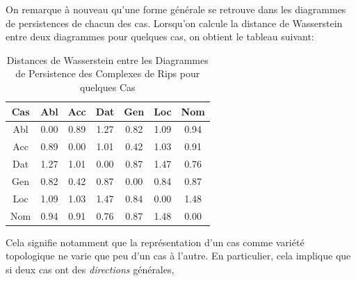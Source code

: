 \documentclass{cours}
\begin{document}
On remarque à nouveau qu'une forme générale se retrouve dans les diagrammes de persistences de chacun des cas.
Lorsqu'on calcule la distance de Wasserstein entre deux diagrammes pour quelques cas, on obtient le tableau suivant:

\begin{table}[H]
\centering
\begin{tabular}{c|cccccc}
	\toprule
	Cas & Abl & Acc & Dat & Gen & Loc & Nom\\
	\midrule
	Abl & 0.00 & 0.89 & 1.27 & 0.82 & 1.09 & 0.94\\
	Acc & 0.89 & 0.00 & 1.01 & 0.42 & 1.03 & 0.91\\
	Dat & 1.27 & 1.01 & 0.00 & 0.87 & 1.47 & 0.76\\
	Gen & 0.82 & 0.42 & 0.87 & 0.00 & 0.84 & 0.87\\
	Loc & 1.09 & 1.03 & 1.47 & 0.84 & 0.00 & 1.48\\
	Nom & 0.94 & 0.91 & 0.76 & 0.87 & 1.48 & 0.00\\
	\bottomrule
\end{tabular}
\caption{Distances de Wasserstein entre les Diagrammes de Persistence des Complexes de Rips pour quelques Cas}
\end{table}

Cela signifie notamment que la représentation d'un cas comme variété topologique ne varie que peu d'un cas à l'autre.
En particulier, cela implique que si deux cas ont des \emph{directions} générales,
\end{document}
